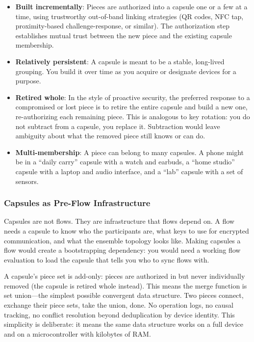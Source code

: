 \documentclass[11pt, letterpaper]{article}
\begin{document}
\begin{itemize}[leftmargin=2em]
  \item \textbf{Built incrementally}: Pieces are authorized into a capsule one or a few
    at a time, using trustworthy out-of-band linking strategies (QR codes, NFC tap,
    proximity-based challenge-response, or similar). The authorization step establishes
    mutual trust between the new piece and the existing capsule membership.
  \item \textbf{Relatively persistent}: A capsule is meant to be a stable, long-lived
    grouping. You build it over time as you acquire or designate devices for a purpose.
  \item \textbf{Retired whole}: In the style of proactive security, the preferred
    response to a compromised or lost piece is to retire the entire capsule and build a
    new one, re-authorizing each remaining piece. This is analogous to key rotation: you
    do not subtract from a capsule, you replace it. Subtraction would leave ambiguity
    about what the removed piece still knows or can do.
  \item \textbf{Multi-membership}: A piece can belong to many capsules. A phone might be
    in a ``daily carry'' capsule with a watch and earbuds, a ``home studio'' capsule with
    a laptop and audio interface, and a ``lab'' capsule with a set of sensors.
\end{itemize}

\subsubsection{Capsules as Pre-Flow Infrastructure}

Capsules are not flows. They are infrastructure that flows depend on. A flow needs a
capsule to know who the participants are, what keys to use for encrypted communication,
and what the ensemble topology looks like. Making capsules a flow would create a
bootstrapping dependency: you would need a working flow evaluation to load the capsule
that tells you who to sync flows with.

A capsule's piece set is add-only: pieces are authorized in but never individually
removed (the capsule is retired whole instead). This means the merge function is set
union---the simplest possible convergent data structure. Two pieces connect, exchange
their piece sets, take the union, done. No operation logs, no causal tracking, no
conflict resolution beyond deduplication by device identity. This simplicity is
deliberate: it means the same data structure works on a full device and on a
microcontroller with kilobytes of RAM.
\end{document}
